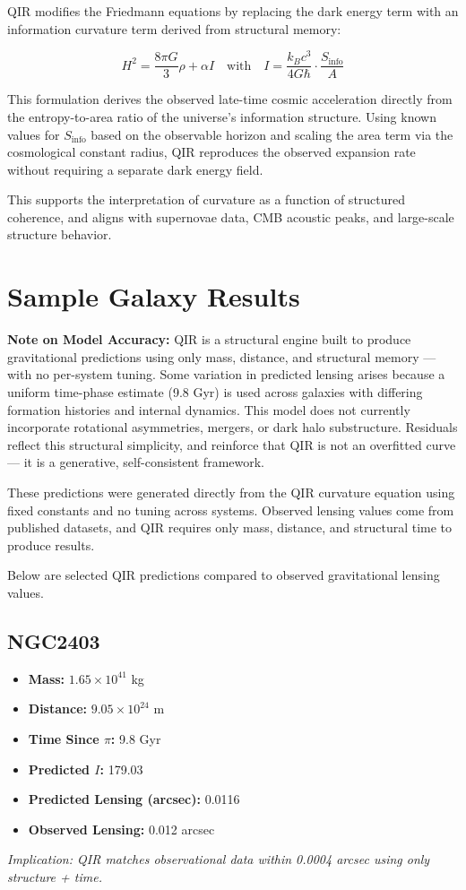 \documentclass[11pt]{article}
\begin{document}
QIR modifies the Friedmann equations by replacing the dark energy term with an information curvature term derived from structural memory:

\[
H^2 = \frac{8\pi G}{3} \rho + \alpha I
\quad \text{with} \quad
I = \frac{k_B c^3}{4 G \hbar} \cdot \frac{S_{\text{info}}}{A}
\]

This formulation derives the observed late-time cosmic acceleration directly from the entropy-to-area ratio of the universe's information structure. Using known values for \( S_{\text{info}} \) based on the observable horizon and scaling the area term via the cosmological constant radius, QIR reproduces the observed expansion rate without requiring a separate dark energy field.

This supports the interpretation of curvature as a function of structured coherence, and aligns with supernovae data, CMB acoustic peaks, and large-scale structure behavior.

\section{Sample Galaxy Results}
\textbf{Note on Model Accuracy:} QIR is a structural engine built to produce gravitational predictions using only mass, distance, and structural memory — with no per-system tuning. Some variation in predicted lensing arises because a uniform time-phase estimate (9.8 Gyr) is used across galaxies with differing formation histories and internal dynamics. This model does not currently incorporate rotational asymmetries, mergers, or dark halo substructure. Residuals reflect this structural simplicity, and reinforce that QIR is not an overfitted curve — it is a generative, self-consistent framework.

These predictions were generated directly from the QIR curvature equation using fixed constants and no tuning across systems. Observed lensing values come from published datasets, and QIR requires only mass, distance, and structural time to produce results.

Below are selected QIR predictions compared to observed gravitational lensing values.

\subsection{NGC2403}
\begin{itemize}
  \item \textbf{Mass:} $1.65 \times 10^{41}$ kg
  \item \textbf{Distance:} $9.05 \times 10^{24}$ m
  \item \textbf{Time Since $\pi$:} 9.8 Gyr
  \item \textbf{Predicted $I$:} 179.03
  \item \textbf{Predicted Lensing (arcsec):} 0.0116
  \item \textbf{Observed Lensing:} 0.012 arcsec
\end{itemize}
\textit{Implication: QIR matches observational data within 0.0004 arcsec using only structure + time.}
\end{document}
